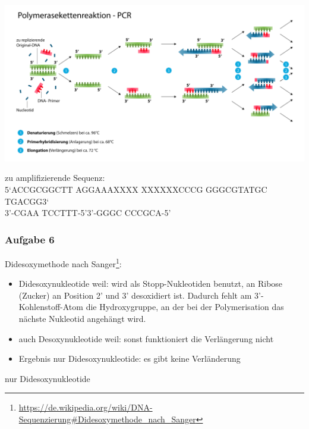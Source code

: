 \includegraphics[width=1\textwidth]{lectures/V1/pix/1024px-Polymerasekettenreaktion.png}

zu amplifizierende Sequenz:\\
5‘ACCGCGGCTT AGGAAAXXXX XXXXXXCCCG GGGCGTATGC TGACGG3‘\\
\noindent\hspace*{17mm}3'-CGAA TCCTTT-5'\hspace*{23mm}3'-GGGC CCCGCA-5'

\subsubsection{Aufgabe 6}
Didesoxymethode nach Sanger\footnote{\url{https://de.wikipedia.org/wiki/DNA-Sequenzierung\#Didesoxymethode_nach_Sanger}}:
\begin{itemize}
	\item Didesoxynukleotide weil: wird als Stopp-Nukleotiden benutzt, an Ribose (Zucker) an Position 2' und 3' desoxidiert ist. Dadurch fehlt am 3'-Kohlenstoff-Atom die Hydroxygruppe, an der bei der Polymerisation das nächste Nukleotid angehängt wird.
	\item auch Desoxynukleotide weil: sonst funktioniert die Verlängerung nicht
	\item Ergebnis nur Didesoxynukleotide: es gibt keine Verländerung
\end{itemize}
nur Didesoxynukleotide
